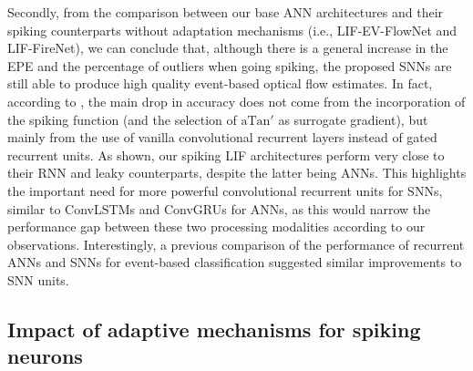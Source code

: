 Secondly, from the comparison between our base ANN architectures and their spiking counterparts without adaptation mechanisms (i.e., LIF-EV-FlowNet and LIF-FireNet), we can conclude that, although there is a general increase in the EPE and the percentage of outliers when going spiking, the proposed SNNs are still able to produce high quality event-based optical flow estimates. In fact, according to , the main drop in accuracy does not come from the incorporation of the spiking function (and the selection of $\text{aTan}'$ as surrogate gradient), but mainly from the use of vanilla convolutional recurrent layers instead of gated recurrent units. As shown, our spiking LIF architectures perform very close to their RNN and leaky counterparts, despite the latter being ANNs. This highlights the important need for more powerful convolutional recurrent units for SNNs, similar to ConvLSTMs \cite{shi2015convolutional} and ConvGRUs \cite{ballas2016delving} for ANNs, as this would narrow the performance gap between these two processing modalities according to our observations. Interestingly, a previous comparison of the performance of recurrent ANNs and SNNs for event-based classification \cite{he2020comparing} suggested similar improvements to SNN units.

\subsection*{Impact of adaptive mechanisms for spiking neurons}\label{sec:neurips_adaptive}


